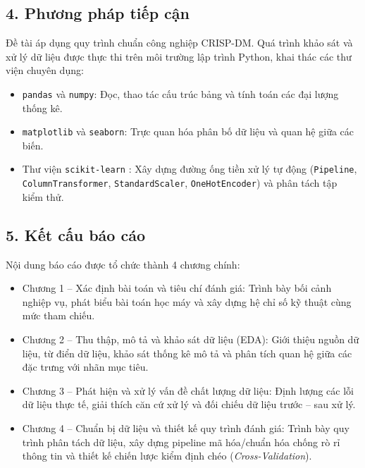 \documentclass[a4paper]{article}
\begin{document}
{\subsection*{\textbf{4. Phương pháp tiếp cận}}
Đề tài áp dụng quy trình chuẩn công nghiệp CRISP-DM. Quá trình khảo sát và xử lý dữ liệu được thực thi trên môi trường lập trình Python, khai thác các thư viện chuyên dụng:
\begin{itemize}
    \item \texttt{pandas} và \texttt{numpy}: Đọc, thao tác cấu trúc bảng và tính toán các đại lượng thống kê.
    \item \texttt{matplotlib} và \texttt{seaborn}: Trực quan hóa phân bố dữ liệu và quan hệ giữa các biến.
    \item Thư viện \texttt{scikit-learn} \cite{pedregosa2011scikit}: Xây dựng đường ống tiền xử lý tự động (\texttt{Pipeline}, \texttt{ColumnTransformer}, \texttt{StandardScaler}, \texttt{OneHotEncoder}) và phân tách tập kiểm thử.
\end{itemize}

\subsection*{\textbf{5. Kết cấu báo cáo}}
Nội dung báo cáo được tổ chức thành 4 chương chính:
\begin{itemize}
    \item Chương 1 -- Xác định bài toán và tiêu chí đánh giá: Trình bày bối cảnh nghiệp vụ, phát biểu bài toán học máy và xây dựng hệ chỉ số kỹ thuật cùng mức tham chiếu.
    \item Chương 2 -- Thu thập, mô tả và khảo sát dữ liệu (EDA): Giới thiệu nguồn dữ liệu, từ điển dữ liệu, khảo sát thống kê mô tả và phân tích quan hệ giữa các đặc trưng với nhãn mục tiêu.
    \item Chương 3 -- Phát hiện và xử lý vấn đề chất lượng dữ liệu: Định lượng các lỗi dữ liệu thực tế, giải thích căn cứ xử lý và đối chiếu dữ liệu trước -- sau xử lý.
    \item Chương 4 -- Chuẩn bị dữ liệu và thiết kế quy trình đánh giá: Trình bày quy trình phân tách dữ liệu, xây dựng pipeline mã hóa/chuẩn hóa chống rò rỉ thông tin và thiết kế chiến lược kiểm định chéo (\textit{Cross-Validation}).
\end{itemize}

}
\vspace{1.5em}
\end{document}
